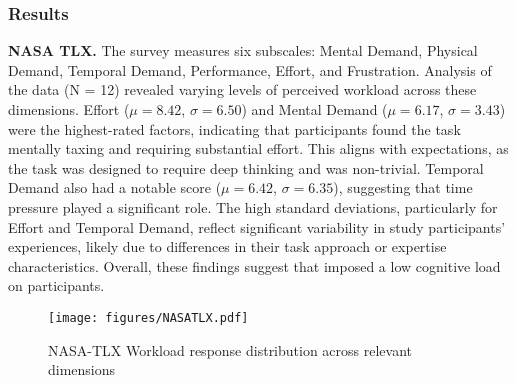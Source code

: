 \subsubsection{Results}
\textbf{NASA TLX.} The survey measures six subscales: Mental Demand, Physical Demand, Temporal Demand, Performance, Effort, and Frustration. Analysis of the data (N = 12) revealed varying levels of perceived workload across these dimensions. Effort ($\mu = 8.42$, $\sigma = 6.50$) and Mental Demand ($\mu = 6.17$, $\sigma = 3.43$) were the highest-rated factors, indicating that participants found the task mentally taxing and requiring substantial effort. This aligns with expectations, as the task was designed to require deep thinking and was non-trivial. Temporal Demand also had a notable score ($\mu = 6.42$, $\sigma = 6.35$), suggesting that time pressure played a significant role.  The high standard deviations, particularly for Effort and Temporal Demand, reflect significant variability in study participants' experiences, likely due to differences in their task approach or expertise characteristics. Overall, these findings suggest that \system imposed a low cognitive load on participants.

%   

\begin{figure}[!t]
  \centering
  \texttt{[image: figures/NASATLX.pdf]}
  \caption{NASA-TLX Workload response distribution across relevant dimensions}
  \label{fig:nasatlx}
\end{figure}


